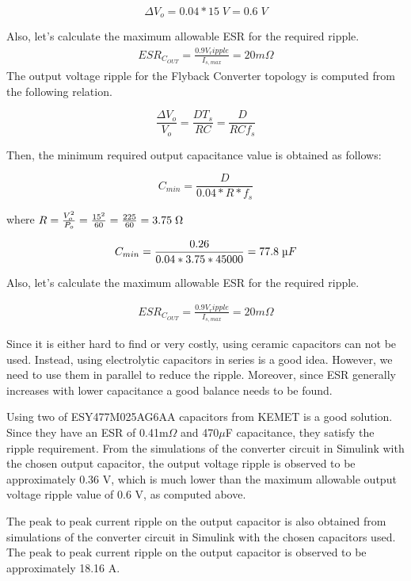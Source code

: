 $$ \Delta V_o = 0.04*15\;V = 0.6\;V $$ 

Also, let's calculate the maximum allowable ESR for the required ripple.
\begin{align*}
    ESR_{C_{OUT}}=\frac{0.9V_ripple}{I_{s,max}}=20m\Omega
\end{align*}
The output voltage ripple for the Flyback Converter topology is computed from the following relation.

$$ \frac{\Delta V_o }{V_o} = \frac{DT_s}{RC} = \frac{D}{RCf_s} $$

Then, the minimum required output capacitance value is obtained as follows:

$$ C_{min} = \frac{D}{0.04*R*f_s} $$

where $ R = \frac{V_o^2}{P_o} = \frac{15^2}{60} = \frac{225}{60} = 3.75\;\ohm $

$$ C_{min} = \frac{0.26}{0.04*3.75*45000} = 77.8\;\micro F $$

Also, let's calculate the maximum allowable ESR for the required ripple.

\begin{align*}
    ESR_{C_{OUT}}=\frac{0.9V_ripple}{I_{s,max}}=20m\Omega
\end{align*}

Since it is either hard to find or very costly, using ceramic capacitors can not be used. Instead, using electrolytic capacitors in series is a good idea. However, we need to use them in parallel to reduce the ripple. Moreover, since ESR generally increases with lower capacitance a good balance needs to be found.

Using two of ESY477M025AG6AA capacitors from KEMET is a good solution. Since they have an ESR of 0.41m$\Omega$ and 470$\mu$F capacitance, they satisfy the ripple requirement.
From the simulations of the converter circuit in Simulink with the chosen output capacitor, the output voltage ripple is observed to be approximately 0.36 V, which is much lower than the maximum allowable output voltage ripple value of 0.6 V, as computed above.

The peak to peak current ripple on the output capacitor is also obtained from simulations of the converter circuit in Simulink with the chosen capacitors used. The peak to peak current ripple on the output capacitor is observed to be approximately 18.16 A.